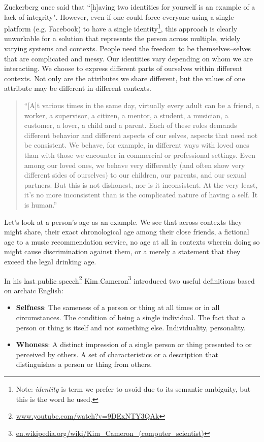 \documentclass[11pt, oneside]{article}   	%
\newcommand{\hyperfootnote}[1][]{\def\ArgI{{#1}}\hyperfootnoteRelay}
\newcommand\hyperfootnoteRelay[2][]{\href{#1#2}{\ArgI}\footnote{\href{#1#2}{#2}}}
\begin{document}
Zuckerberg once said that ``[h]aving two identities for yourself is an example of a lack of integrity"\cite{Kirkpatrick2011}. However, even if one could force everyone using a single platform (e.g. Facebook) to have a single identity\footnote{Note: \emph{identity} is term we prefer to avoid due to its semantic ambiguity, but this is the word he used.}, this approach is clearly unworkable for a solution that represents the person across multiple, widely varying systems and contexts. People need the freedom to be themselves--selves that are complicated and messy. Our identities vary depending on whom we are interacting. We choose to express different parts of ourselves within different contexts. Not only are the attributes we share different, but the values of one attribute may be different in different contexts. 

\begin{quote} 
	``[A]t various times in the same day, virtually every adult can be a friend, a worker, a supervisor, a citizen, a mentor, a student, a musician, a customer, a lover, a child and a parent. Each of these roles demands different behavior and different aspects of our selves, aspects that need not be consistent. We behave, for example, in different ways with loved ones than with those we encounter in commercial or professional settings. Even among our loved ones, we behave very differently (and often show very different sides of ourselves) to our children, our parents, and our sexual partners. But this is not dishonest, nor is it inconsistent. At the very least, it's no more inconsistent than is the complicated nature of having a self. It is human.''\cite[p122]{Richards2021}
\end{quote}

Let's look at a person's age as an example. We see that across contexts they might share, their exact chronological age among their close friends, a fictional age to a music recommendation service, no age at all in contexts wherein doing so might cause discrimination against them, or a merely a statement that they exceed the legal drinking age. 

In his \hyperfootnote[last public speech][https://]{www.youtube.com/watch?v=9DExNTY3QAk}  
\hyperfootnote[Kim Cameron][https://]{en.wikipedia.org/wiki/Kim\_Cameron\_(computer\_scientist)} introduced two useful definitions based on archaic English:

\begin{itemize}
\item \textbf{Selfness}: The sameness of a person or thing at all times or in all circumstances. The condition of being a single individual. The fact that a person or thing is itself and not something else. Individuality, personality. 
\item \textbf{Whoness}: A distinct impression of a single person or thing presented to or perceived by others. A set of characteristics or a description that distinguishes a person or thing from others. 
\end{itemize}
\end{document}
